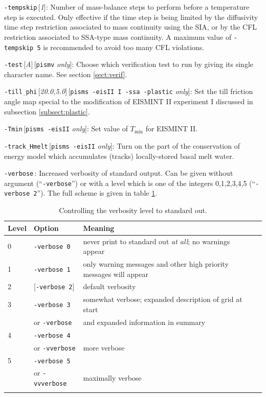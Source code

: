 \documentclass[11pt,final]{amsart}
\renewcommand{\t}[1]{\texttt{#1}}
\newcommand{\rawopt}[1]{\vspace{1mm}\noindent \large\texttt{-#1}\normalsize}
\newcommand{\opt}[1]{\rawopt{#1}\,:\quad}
\newcommand{\optdef}[2]{\rawopt{#1}\,[\textsl{#2}]:\quad}
\newcommand{\optrestrict}[2]{\rawopt{#1}\,[\texttt{#2} \textsl{only}]:\quad}
\newcommand{\optdefrestrict}[3]{\rawopt{#1}\,[\textsl{#2}]\,[\texttt{#3} \textsl{only}]:\quad}
\newcommand{\und}{$\underline{\,\,\,}$}
\begin{document}
\optdef{tempskip}{1}  Number of mass-balance steps to perform before a temperature step is executed.  Only effective if the time step is being limited by the diffusivity time step restriction associated to mass continuity using the SIA, or by the CFL restriction associated to SSA-type mass continuity.  A maximum value of \verb|-tempskip 5| is recommended to avoid too many CFL violations.

\optdefrestrict{test}{A}{pismv}  Choose which verification test to run by giving its single character name.  See section \ref{sect:verif}.

\optdefrestrict{till\und phi}{20.0,5.0}{pisms -eisII I -ssa -plastic}  Set the till friction angle map special to the modification of EISMINT II experiment I discussed in subsection \ref{subsect:plastic}.

\optrestrict{Tmin}{pisms -eisII}    Set value of $T_{\text{min}}$ for EISMINT II.

\optrestrict{track\und Hmelt}{pisms -eisII}    Turn on the part of the conservation of energy model which accumulates (tracks) locally-stored basal melt water.

\opt{verbose}   Increased verbosity of standard output.  Can be given without argument (``\verb|-verbose|'') or with a level which is one of the integers 0,1,2,3,4,5 (``\verb|-verbose 2|'').  The full scheme is given in table \ref{tab:verbosity}.

\begin{table}[ht]
\caption{Controlling the verbosity level to standard out.}\label{tab:verbosity}
\begin{tabular}{@{}llll}\hline
\textbf{Level} & \textbf{Option} & \textbf{Meaning} \\ \hline
   0  &  \t{-verbose 0} &   never print to standard out \emph{at all}; no warnings appear  \\
   1  &  \t{-verbose 1} &   only warning messages and other high priority messages will appear  \\
   2  &  [\t{-verbose 2}] & default verbosity    \\
   3  &  \t{-verbose 3} &   somewhat verbose; expanded description of grid at start  \\
      &  or \quad \t{-verbose} &  and expanded information in summary    \\
   4  &  \t{-verbose 4} &     \\
      &  or \quad \t{-vverbose} &  more verbose    \\
   5  &  \t{-verbose 5} &     \\
      &  or \quad \t{-vvverbose} &  maximally verbose \\
\hline
\normalsize
\end{tabular}
\end{table}
\end{document}
